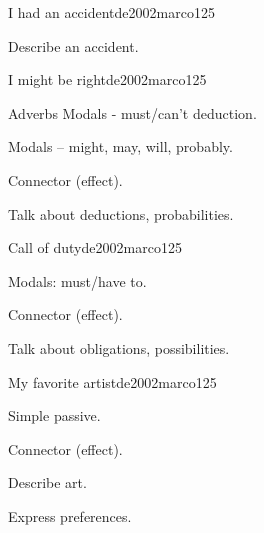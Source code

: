 \begin{syllabus}
\begin{unit}{I had an accident}{}{de2002marco}{12}{5}
   \begin{learningoutcomes}
      \item Describe an accident.
   \end{learningoutcomes}
\end{unit}

\begin{unit}{I might be right}{}{de2002marco}{12}{5}
   \begin{topics}
      \item Adverbs Modals - must/can’t deduction.
      \item Modals – might, may, will, probably.
      \item Connector (effect).
   \end{topics}

   \begin{learningoutcomes}
      \item Talk about deductions, probabilities. 
   \end{learningoutcomes}
\end{unit}

\begin{unit}{Call of duty}{}{de2002marco}{12}{5}
   \begin{topics}
      \item Modals: must/have to.
      \item Connector (effect).
   \end{topics}

   \begin{learningoutcomes}
      \item Talk about obligations, possibilities.
   \end{learningoutcomes}
\end{unit}

\begin{unit}{My favorite artist}{}{de2002marco}{12}{5}
   \begin{topics}
      \item Simple passive.
      \item Connector (effect).
   \end{topics}

   \begin{learningoutcomes}
      \item Describe art.
      \item Express preferences.
   \end{learningoutcomes}

\end{unit}


\end{syllabus}

